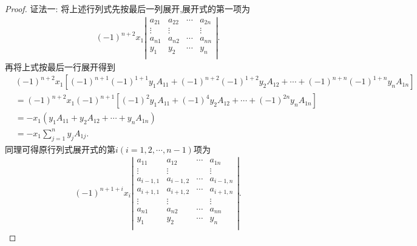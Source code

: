 \documentclass[../../main.tex]{subfiles}%
\begin{document}
\begin{proof}

{\color{blue}证法一:}
将上述行列式先按最后一列展开,展开式的第一项为
\begin{equation}
\begin{split}
\left( -1 \right) ^{n+2}x_1\left| \begin{matrix}
a_{21}&		a_{22}&		\cdots&		a_{2n}\\
\vdots&		\vdots&		&		\vdots\\
a_{n1}&		a_{n2}&		\cdots&		a_{nn}\\
y_1&		y_2&		\cdots&		y_n\\
\end{matrix} \right|.
\end{split}
\nonumber
\end{equation}
再将上式按最后一行展开得到
\begin{equation}
\begin{split}
&\left( -1 \right) ^{n+2}x_1\left[ \left( -1 \right) ^{n+1}\left( -1 \right) ^{1+1}y_1A_{11}+\left( -1 \right) ^{n+2}\left( -1 \right) ^{1+2}y_2A_{12}+\cdots +\left( -1 \right) ^{n+n}\left( -1 \right) ^{1+n}y_nA_{1n} \right]
\\
&=\left( -1 \right) ^{n+2}x_1\left( -1 \right) ^{n+1}\left[ \left( -1 \right) ^2y_1A_{11}+\left( -1 \right) ^4y_2A_{12}+\cdots +\left( -1 \right) ^{2n}y_nA_{1n} \right] 
\\
&=-x_1\left( y_1A_{11}+y_2A_{12}+\cdots +y_nA_{1n} \right)
\\
&=-x_1\sum_{j=1}^n{y_jA_{1j}}.            
\end{split}
\nonumber
\end{equation}
同理可得原行列式展开式的第$i(i=1,2,\cdots,n-1)$项为
\begin{equation}
\begin{split}
\left( -1 \right) ^{n+1+i}x_i\left| \begin{matrix}
a_{11}&		a_{12}&		\cdots&		a_{1n}\\
\vdots&		\vdots&		&		\vdots\\
a_{i-1,1}&		a_{i-1,2}&		\cdots&		a_{i-1,n}\\
a_{i+1,1}&		a_{i+1,2}&		\cdots&		a_{i+1,n}\\
\vdots&		\vdots&		&		\vdots\\
a_{n1}&		a_{n2}&		\cdots&		a_{nn}\\
y_1&		y_2&		\cdots&		y_n\\
\end{matrix} \right|.
\end{split}

\end{equation}
\end{proof}
\end{document}
